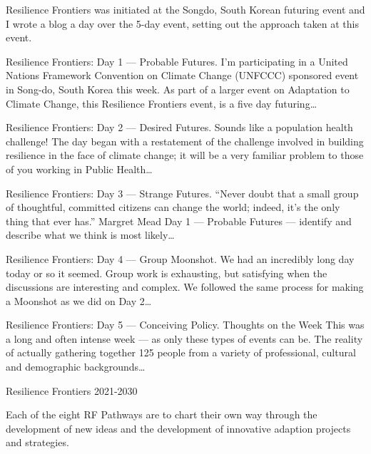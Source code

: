 Resilience Frontiers was initiated at the Songdo, South Korean futuring event and I wrote a blog a day over the 5-day event, setting out the approach taken at this event.

Resilience Frontiers: Day 1 — Probable Futures. I’m participating in a United Nations Framework Convention on Climate Change (UNFCCC) sponsored event in Song-do, South Korea this week. As part of a larger event on Adaptation to Climate Change, this Resilience Frontiers event, is a five day futuring…

Resilience Frontiers: Day 2 — Desired Futures. Sounds like a population health challenge! The day began with a restatement of the challenge involved in building resilience in the face of climate change; it will be a very familiar problem to those of you working in Public Health…

Resilience Frontiers: Day 3 — Strange Futures. “Never doubt that a small group of thoughtful, committed citizens can change the world; indeed, it’s the only thing that ever has.” Margret Mead Day 1 — Probable Futures — identify and describe what we think is most likely…

Resilience Frontiers: Day 4 — Group Moonshot. We had an incredibly long day today or so it seemed. Group work is exhausting, but satisfying when the discussions are interesting and complex. We followed the same process for making a Moonshot as we did on Day 2…

Resilience Frontiers: Day 5 — Conceiving Policy. Thoughts on the Week This was a long and often intense week — as only these types of events can be. The reality of actually gathering together 125 people from a variety of professional, cultural and demographic backgrounds…

Resilience Frontiers 2021-2030

Each of the eight RF Pathways are to chart their own way through the development of new ideas and the development of innovative adaption projects and strategies.


